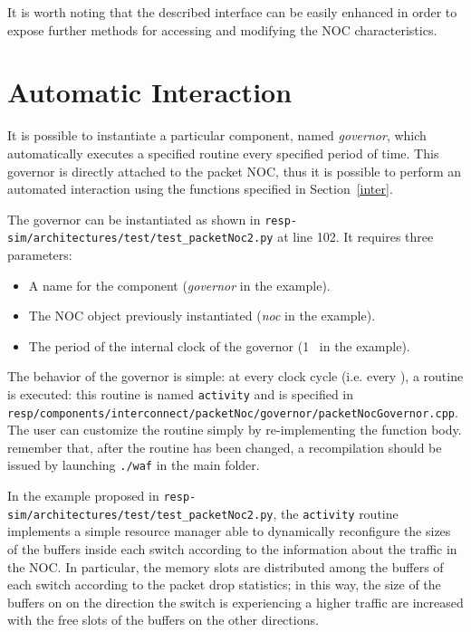 \documentclass[a4paper,11pt,oneside]{article}
\begin{document}
It is worth noting that the described interface can be easily enhanced in order to expose further methods for accessing and modifying the NOC characteristics.

\section{Automatic Interaction}
\label{autointer}
It is possible to instantiate a particular component, named \textit{governor}, which automatically executes a specified routine every specified period of time. This governor is directly attached to the packet NOC, thus it is possible to perform an automated interaction using the functions specified in Section~\ref{inter}.

The governor can be instantiated as shown in \texttt{resp-sim/\linebreak architectures/test/test\_packetNoc2.py} at line 102. It requires three parameters:
\begin{itemize}
  \item A name for the component (\textit{governor} in the example).
  \item The NOC object previously instantiated (\textit{noc} in the example).
  \item The period of the internal clock of the governor (1 \milli\second~in the example).
\end{itemize}

The behavior of the governor is simple: at every clock cycle (i.e. every \milli\second), a routine is executed: this routine is named \texttt{activity} and is specified in \texttt{resp/components/interconnect/packetNoc/governor/packetNocGover\linebreak nor.cpp}.
The user can customize the routine simply by re-implementing the function body. remember that, after the routine has been changed, a recompilation should be issued by launching \texttt{./waf} in the main folder.
 
In the example proposed in \texttt{resp-sim/architectures/test/test\linebreak \_packetNoc2.py}, the \texttt{activity} routine implements a simple resource manager able to dynamically reconfigure the sizes of the buffers inside each switch according to the information about the traffic in the NOC. In particular, the memory slots are distributed among the buffers of each switch according to the packet drop statistics; in this way, the size of the buffers on on the direction the switch is experiencing a higher traffic are increased with the free slots of the buffers on the other directions.
\end{document}
